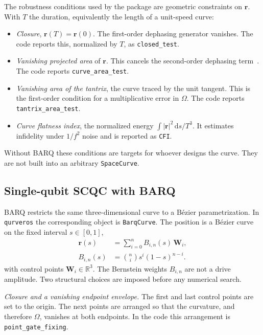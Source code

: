 \documentclass[11pt,a4paper]{article}
\theoremstyle{definition}
\newcommand{\abs}[1]{\lvert #1\rvert}
\newcommand{\dd}{\mathrm{d}}
\begin{document}
The robustness conditions used by the package are geometric constraints on
\(\mathbf{r}\).  With \(T\) the duration, equivalently the length of a
unit-speed curve:
\begin{itemize}
  \item \emph{Closure}, \(\mathbf{r}(T)=\mathbf{r}(0)\).  The first-order
        dephasing generator vanishes.  The code reports this, normalized by
        \(T\), as \texttt{closed\_test}.
  \item \emph{Vanishing projected area} of \(\mathbf{r}\).  This cancels the
        second-order dephasing term~\cite{BarnesReview}.  The code reports
        \texttt{curve\_area\_test}.
  \item \emph{Vanishing area of the tantrix}, the curve traced by the unit
        tangent.  This is the first-order condition for a multiplicative error
        in \(\Omega\).  The code reports \texttt{tantrix\_area\_test}.
  \item \emph{Curve flatness index}, the normalized energy
        \(\int\abs{\mathbf{r}}^2\,\dd s/T^3\).  It estimates infidelity under
        \(1/f^2\) noise and is reported as \texttt{CFI}.
\end{itemize}
Without BARQ these conditions are targets for whoever designs the curve.  They
are not built into an arbitrary \texttt{SpaceCurve}.

\subsection{Single-qubit SCQC with BARQ}
\label{sec:barq-review}

BARQ restricts the same three-dimensional curve to a B\'ezier parametrization.
In \texttt{qurveros} the corresponding object is \texttt{BarqCurve}.
The position is a B\'ezier curve on the
fixed interval \(s\in[0,1]\),
\begin{equation}
\begin{aligned}
  \mathbf{r}(s)&=\sum_{i=0}^{n} B_{i,n}(s)\,\mathbf{W}_i,\\
  B_{i,n}(s)&=\binom{n}{i}s^i(1-s)^{n-i}.
\end{aligned}
\end{equation}
with control points \(\mathbf{W}_i\in\mathbb{R}^3\).  The Bernstein weights
\(B_{i,n}\) are not a drive amplitude.  Two structural choices are imposed
before any numerical search.

\emph{Closure and a vanishing endpoint envelope.}  The first and last control
points are set to the origin.  The next points are arranged so that the
curvature, and therefore \(\Omega\), vanishes at both endpoints.  In the code
this arrangement is \texttt{point\_gate\_fixing}.
\end{document}
